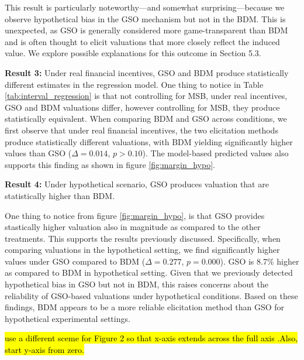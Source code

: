 \documentclass[12pt]{article}
\begin{document}
This result is particularly noteworthy—and somewhat surprising—because we observe hypothetical bias in the GSO mechanism but not in the BDM. This is unexpected, as GSO is generally considered more game-transparent than BDM and is often thought to elicit valuations that more closely reflect the induced value. We explore possible explanations for this outcome in Section 5.3.
\vspace{0.5cm}



\textbf{Result 3:} Under real financial incentives, GSO and BDM produce statistically different estimates in the regression model. 
One thing to notice in Table \ref{tab:interval_regression} is that not controlling for MSB, under real incentives, GSO and BDM valuations differ, however controlling for MSB, they produce statistically equivalent.
When comparing BDM and GSO across conditions, we first observe that under real financial incentives, the two elicitation methods produce statistically different valuations, with BDM yielding significantly higher values than GSO (\(\Delta = 0.014\), \(p > 0.10\)). The model-based predicted values also supports this finding as shown in figure \ref{fig:margin_hypo}.
\vspace{0.5cm}

\textbf{Result 4:} Under hypothetical scenario, GSO produces valuation that are statistically higher than BDM.

One thing to notice from figure \ref{fig:margin_hypo}, is that GSO provides stastically higher valuation also in magnitude as compared to the other treatments. This supports the results previously discussed. Specifically, when comparing valuations in the hypothetical setting, we find significantly higher values under GSO compared to BDM  (\(\Delta = 0.277\), \(p = 0.000\)). GSO  is 8.7\% higher as compared to BDM in hypothetical setting. Given that we previously detected hypothetical bias in GSO but not in BDM, this raises concerns about the reliability of GSO-based valuations under hypothetical conditions. Based on these findings, BDM appears to be a more reliable elicitation method than GSO for hypothetical experimental settings.




\hl{use a different sceme for Figure 2 so that x-axis extends across the full axis .Also, start y-axis from zero.}
\end{document}
